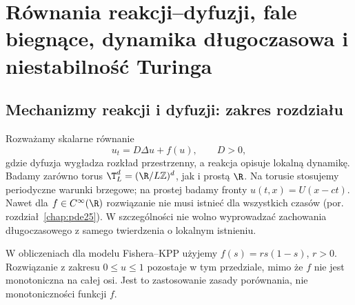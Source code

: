 \chapter[Reakcja--dyfuzja i fale biegnące]{Równania reakcji--dyfuzji, fale biegnące, dynamika długoczasowa i niestabilność Turinga}
\label{chap:pde27}

\section{Mechanizmy reakcji i dyfuzji: zakres rozdziału}
Rozważamy skalarne równanie
\begin{equation}\label{eq:pde27-main}
 u_t=D\Delta u+f(u),\qquad D>0,
\end{equation}
gdzie dyfuzja wygładza rozkład przestrzenny, a reakcja opisuje
lokalną dynamikę. Badamy zarówno torus
$\T_L^d=(\R/L\mathbb Z)^d$, jak i prostą $\R$.
Na torusie stosujemy periodyczne warunki brzegowe;
na prostej badamy fronty $u(t,x)=U(x-ct)$.
Nawet dla $f\in C^\infty(\R)$ rozwiązanie
nie musi istnieć dla wszystkich czasów (por. rozdział~\ref{chap:pde25}).
W szczególności nie wolno wyprowadzać zachowania długoczasowego
z samego twierdzenia o lokalnym istnieniu.

W obliczeniach dla modelu Fishera--KPP użyjemy
$f(s)=rs(1-s)$, $r>0$. Rozwiązanie z zakresu $0\le u\le1$
pozostaje w tym przedziale, mimo że $f$ nie jest monotoniczna
na całej osi. Jest to zastosowanie zasady porównania,
nie monotoniczności funkcji $f$.

